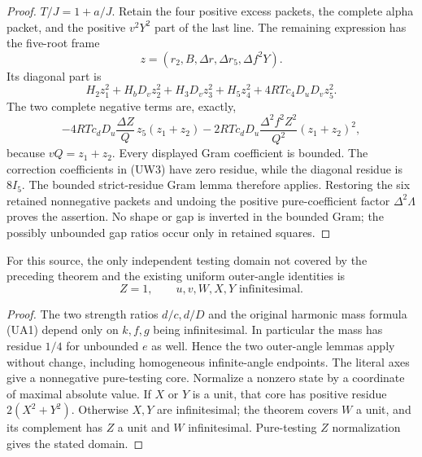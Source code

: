 \begin{proof}
$T/J=1+a/J$.  Retain the four positive excess packets, the complete
alpha packet, and the positive $v^2Y^2$ part of the last line.
The remaining expression has the five-root frame
\[
 z=(r_2,B,\Delta r,\Delta r_5,\Delta f^2Y).
\]
Its diagonal part is
\[
 H_2z_1^2+H_bD_vz_2^2+H_3D_vz_3^2+H_5z_4^2
       +4RTc_4D_uD_vz_5^2.
\]
The two complete negative terms are, exactly,
\[
 -4RTc_dD_u\frac{\Delta Z}{Q}\,z_5(z_1+z_2)
 -2RTc_dD_u\frac{\Delta^2f^2Z^2}{Q^2}(z_1+z_2)^2,       \tag{UW3}
\]
because $vQ=z_1+z_2$.  Every displayed Gram coefficient is bounded.
The correction coefficients in (UW3) have zero residue, while the
diagonal residue is $8I_5$.  The bounded strict-residue Gram lemma
therefore applies.  Restoring the six retained nonnegative packets and
undoing the positive pure-coefficient factor $\Delta^2\Lambda$ proves
the assertion.  No shape or gap is inverted in the bounded Gram;
the possibly unbounded gap ratios occur only in retained squares.
\end{proof}

\begin{corollary}
For this source, the only independent testing domain not covered by
the preceding theorem and the existing uniform outer-angle identities
is
\[
 Z=1,\qquad u,v,W,X,Y\text{ infinitesimal}.
\]
\end{corollary}
\begin{proof}
The two strength ratios $d/c,d/D$ and the original harmonic mass
formula (UA1) depend only on $k,f,g$ being infinitesimal.  In particular
the mass has residue $1/4$ for unbounded $e$ as well.  Hence the two
outer-angle lemmas apply without change, including homogeneous
infinite-angle endpoints.  The literal axes give a nonnegative
pure-testing core.  Normalize a nonzero state by a coordinate of
maximal absolute value.  If $X$ or $Y$ is a unit, that core has positive
residue $2(X^2+Y^2)$.  Otherwise $X,Y$ are infinitesimal; the theorem
covers $W$ a unit, and its complement has $Z$ a unit and $W$
infinitesimal.  Pure-testing $Z$ normalization gives the stated domain.
\end{proof}
